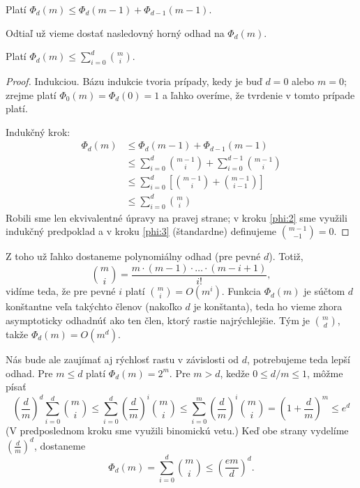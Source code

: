 \begin{theorem}
  Platí $\Phi_d(m) \leq \Phi_d(m-1) + \Phi_{d-1}(m-1)$.
\end{theorem}

Odtiaľ už vieme dostať nasledovný horný odhad na $\Phi_d(m)$.

\begin{theorem}
  Platí $\Phi_d(m) \leq \sum_{i=0}^d {m \choose i}$.
\end{theorem}
\begin{proof}
  Indukciou. Bázu indukcie tvoria prípady, kedy je buď $d = 0$ alebo $m = 0$;
  zrejme platí $\Phi_0(m) = \Phi_d(0) = 1$ a ľahko overíme, že tvrdenie
  v tomto prípade platí.
  
  Indukčný krok:
  \begin{align}
    \Phi_d(m)
      &\leq \Phi_d(m - 1) + \Phi_{d-1}(m - 1) \\
      &\leq \sum_{i=0}^d {{m - 1} \choose i} + \sum_{i=0}^{d-1} {{m - 1} \choose i} \label{phi:2} \\
      &\leq \sum_{i=0}^d \left[ {{m - 1} \choose i} + {{m - 1} \choose {i - 1}} \right] \label{phi:3} \\
      &\leq \sum_{i=0}^d {m \choose i}
  \end{align}
  Robili sme len ekvivalentné úpravy na pravej strane; v kroku \ref{phi:2}
  sme využili indukčný predpoklad a v kroku \ref{phi:3} (štandardne) definujeme
  ${{m - 1} \choose -1} = 0$.
\end{proof}

Z toho už ľahko dostaneme polynomiálny odhad (pre pevné $d$). Totiž,
$$ {m \choose i} = \frac{m \cdot (m - 1) \cdot \ldots \cdot (m - i + 1)}{i!}, $$
vidíme teda, že pre pevné $i$ platí ${m \choose i} = O(m^i)$. Funkcia
$\Phi_d(m)$ je súčtom $d$ konštantne veľa takýchto členov (nakoľko $d$ je
konštanta), teda ho vieme zhora asymptoticky odhadnúť ako ten člen, ktorý
rastie najrýchlejšie. Tým je ${m \choose d}$, takže $\Phi_d(m) = O(m^d)$.

Nás bude ale zaujímať aj rýchlosť rastu v závislosti od $d$, potrebujeme
teda lepší odhad. Pre $m \leq d$ platí $\Phi_d(m) = 2^m$. Pre $m > d$,
kedže $0 \leq d/m \leq 1$, môžme písať
$$
  \left( \frac{d}{m} \right)^d \sum_{i=0}^d {m \choose i}
    \leq \sum_{i=0}^d \left( \frac{d}{m} \right)^i {m \choose i}
    \leq \sum_{i=0}^m \left( \frac{d}{m} \right)^i {m \choose i}
    = \left( 1 + \frac{d}{m} \right)^m \leq e^d
$$
(V predposlednom kroku sme využili binomickú vetu.) Keď obe strany
vydelíme $\left( \frac{d}{m} \right)^d$, dostaneme
$$ \Phi_d(m) = \sum_{i=0}^d {m \choose i} \leq \left( \frac{em}{d} \right)^d. $$


